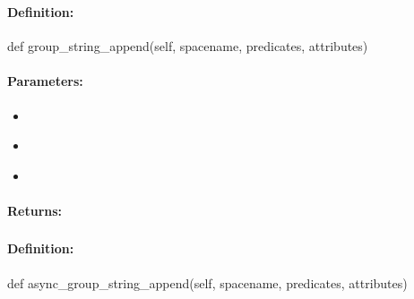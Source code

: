 \pagebreak
\subsubsection{}
\label{api:python:group_string_append}


\paragraph{Definition:}
\begin{pythoncode}
def group_string_append(self, spacename, predicates, attributes)
\end{pythoncode}

\paragraph{Parameters:}
\begin{itemize}[noitemsep]
\item {}\\

\item {}\\

\item {}\\

\end{itemize}

\paragraph{Returns:}


\pagebreak
\subsubsection{}
\label{api:python:async_group_string_append}


\paragraph{Definition:}
\begin{pythoncode}
def async_group_string_append(self, spacename, predicates, attributes)
\end{pythoncode}


